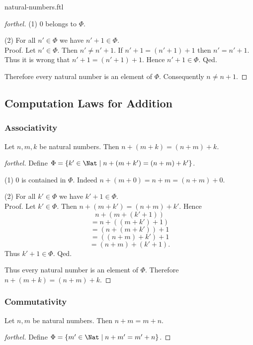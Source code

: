 \documentclass{naproche-library}
\begin{document}
\begin{smodule}{natural-numbers.ftl}
\begin{proof}[forthel]
    (1) $0$ belongs to $\Phi$.

    (2) For all $n' \in \Phi$ we have $n' + 1 \in \Phi$. \\
    Proof.
      Let $n' \in \Phi$.
      Then $n' \neq n' + 1$.
      If $n' + 1 = (n' + 1) + 1$ then $n' = n' + 1$.
      Thus it is wrong that $n' + 1 = (n' + 1) + 1$.
      Hence $n' + 1 \in \Phi$.
    Qed.

    Therefore every natural number is an element of $\Phi$.
    Consequently $n \neq n + 1$.
  \end{proof}


  \subsection*{Computation Laws for Addition}

  \subsubsection*{Associativity}

  \begin{proposition}[forthel,id=ARITHMETIC_03_3235893452210176,printid]
    Let $n, m, k$ be natural numbers.
    Then $n + (m + k) = (n + m) + k$.
  \end{proposition}
  \begin{proof}[forthel]
    Define $\Phi = \{ k' \in \Nat \mid n + (m + k') = (n + m) + k' \}$.

    (1) $0$ is contained in $\Phi$.
    Indeed $n + (m + 0) = n + m = (n + m) + 0$.

    (2) For all $k' \in \Phi$ we have $k' + 1 \in \Phi$. \\
    Proof.
      Let $k' \in \Phi$.
      Then $n + (m + k') = (n + m) + k'$.
      Hence
      \[  n + (m + (k' + 1))        \]
      \[    = n + ((m + k') + 1)    \]
      \[    = (n + (m + k')) + 1    \]
      \[    = ((n + m) + k') + 1    \]
      \[    = (n + m) + (k' + 1).   \]
      Thus $k' + 1 \in \Phi$.
    Qed.

    Thus every natural number is an element of $\Phi$.
    Therefore $n + (m + k) = (n + m) + k$.
  \end{proof}


  \subsubsection*{Commutativity}

  \begin{proposition}[forthel,id=ARITHMETIC_03_4029553232052224,printid]
    Let $n, m$ be natural numbers.
    Then $n + m = m + n$.
  \end{proposition}
  \begin{proof}[forthel]
    Define $\Phi = \{ m' \in \Nat \mid n + m' = m' + n \}$.


\end{proof}
\end{smodule}
\end{document}
